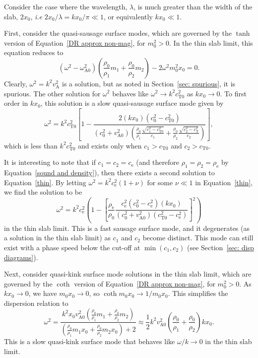 \documentclass[12pt,draft]{../style-files/ociamthesis}
\begin{document}
Consider the case where the wavelength, $\lambda$, is much greater than the width of the slab, $2x_0$, \textit{i.e} $2x_0/\lambda = kx_0/\pi \ll 1$, or equivalently $kx_0 \ll 1$.

First, consider the quasi-sausage surface modes, which are governed by the $\tanh$ version of Equation~\eqref{DR approx non-mag}, for $m_0^2 > 0$. In the thin slab limit, this equation reduces to
\begin{equation}
(\omega^2 - \omega_\textrm{A0}^2)\left(\frac{\rho_0}{\rho_1}m_1 + \frac{\rho_0}{\rho_2}m_2\right) -  2\omega^2m_0^2x_0 = 0. \label{thin}
\end{equation}
Clearly, $\omega^2={k^2v_\textrm{A}^2}$ is a solution, but as noted in Section~\ref{sec: spurious}, it is spurious. The other solution for $\omega^2$ behaves like $\omega^2 \to k^2c_\textrm{T0}^2$ as $kx_0 \to 0$. To first order in $kx_0$, this solution is a slow quasi-sausage surface mode given by
\begin{equation}
\omega^2 = k^2c_\textrm{T0}^2 \left[1 - \frac{2(kx_0)(c_0^2 - c_\textrm{T0}^2)}{(c_0^2 + v_\textrm{A0}^2)\left(\frac{\rho_0}{\rho_1}\frac{\sqrt{c_1^2 - c_\textrm{T0}^2}}{c_1} + \frac{\rho_0}{\rho_2}\frac{\sqrt{c_2^2 - c_\textrm{T}^2}}{c_2}\right)}\right],
\label{thin slab slow saus surf}
\end{equation}
which is less than $k^2c_\textrm{T0}^2$ and exists only when $c_1 > c_\textrm{T0}$ and $c_2 > c_\textrm{T0}$. 

It is interesting to note that if $c_1 = c_2 = c_\textrm{e}$ (and therefore $\rho_1 = \rho_2 = \rho_\textrm{e}$ by Equation~\eqref{sound and density}), then there exists a second solution to Equation~\eqref{thin}. By letting $\omega^2 = k^2c_\textrm{e}^2(1 + \nu)$ for some $\nu \ll 1$ in Equation~\eqref{thin}, we find the solution to be
\begin{equation}
\omega^2 = k^2c_\textrm{e}^2\left(1 - \left[\frac{\rho_\textrm{e}}{\rho_0}\frac{c_\textrm{e}^2(c_0^2 - c_\textrm{e}^2)(kx_0)}{(c_0^2 + v_\textrm{A0}^2)(c_\textrm{T0}^2 - c_\textrm{e}^2)}\right]^2\right)
\label{thin slab fast saus surf}
\end{equation}
in the thin slab limit. This is a fast sausage surface mode, and it degenerates (as a solution in the thin slab limit) as $c_1$ and $c_2$ become distinct. This mode can still exist with a phase speed below the cut-off at $\min(c_1, c_2)$ (see Section~\ref{sec: disp diagrams}).

Next, consider quasi-kink surface mode solutions in the thin slab limit, which are governed by the $\coth$ version of Equation~\eqref{DR approx non-mag}, for $m_0^2 > 0$. As $kx_0 \to 0$, we have $m_0x_0 \to 0$, so $\coth{m_0x_0} \to 1/m_0x_0$. This simplifies the dispersion relation to
\begin{equation}
\omega^2 = \frac{k^2x_0v_\textrm{A0}^2\left(\frac{\rho_0}{\rho_1}m_1 + \frac{\rho_0}{\rho_2}m_2\right)}{\left(\frac{\rho_0}{\rho_1}m_1x_0 + \frac{\rho_0}{\rho_2}m_2x_0\right) + 2} \approx \frac{1}{2}k^2v_\textrm{A0}^2\left(\frac{\rho_0}{\rho_1} + \frac{\rho_0}{\rho_2}\right)kx_0.
\label{thin slab slow kink surf}
\end{equation}
This is a slow quasi-kink surface mode that behaves like $\omega/k \to 0$ in the thin slab limit.
\end{document}
